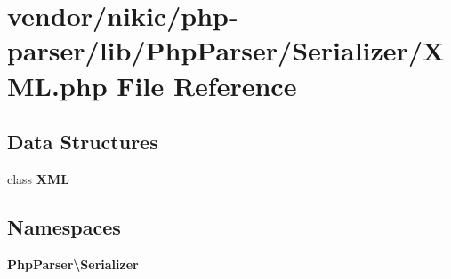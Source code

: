 \section{vendor/nikic/php-\/parser/lib/\+Php\+Parser/\+Serializer/\+X\+M\+L.php File Reference}
\label{nikic_2php-parser_2lib_2_php_parser_2_serializer_2_x_m_l_8php}
\subsection*{Data Structures}
\begin{DoxyCompactItemize}
\item 
class {\bf X\+M\+L}
\end{DoxyCompactItemize}
\subsection*{Namespaces}
\begin{DoxyCompactItemize}
\item 
 {\bf Php\+Parser\textbackslash{}\+Serializer}
\end{DoxyCompactItemize}
